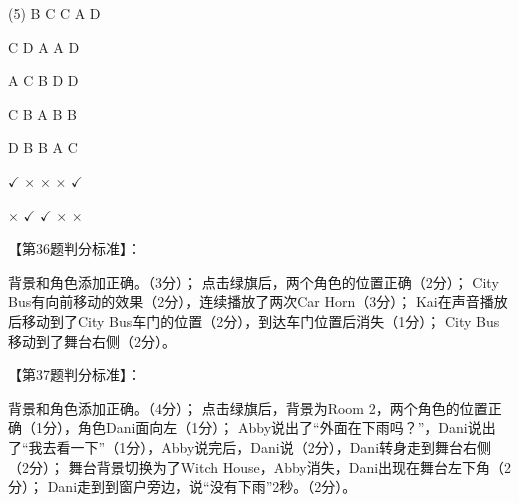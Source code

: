\documentclass[10pt, a4paper]{article}
\begin{document}
        \begin{tasks}[label=\arabic*.](5)
            \task B
            \task C
            \task C
            \task A
            \task D

            \task C
            \task D
            \task A
            \task A
            \task D

            \task A
            \task C
            \task B
            \task D
            \task D

            \task C
            \task B
            \task A
            \task B
            \task B

            \task D
            \task B
            \task B
            \task A
            \task C

            \task $\checkmark$
            \task $\times$
            \task $\times$
            \task $\times$
            \task $\checkmark$

            \task $\times$
            \task $\checkmark$
            \task $\checkmark$
            \task $\times$
            \task $\times$
        \end{tasks}

        【第36题判分标准】：
        \begin{tasks}[label=(\arabic*)]
            \task 背景和角色添加正确。（3分）；
            \task 点击绿旗后，两个角色的位置正确（2分）；
            \task City Bus有向前移动的效果（2分），连续播放了两次Car Horn（3分）；
            \task Kai在声音播放后移动到了City Bus车门的位置（2分），到达车门位置后消失（1分）；
            \task City Bus移动到了舞台右侧（2分）。
        \end{tasks}

        【第37题判分标准】：
        \begin{tasks}[label=(\arabic*)]
            \task 背景和角色添加正确。（4分）； 
            \task 点击绿旗后，背景为Room 2，两个角色的位置正确（1分），角色Dani面向左（1分）；
            \task Abby说出了“外面在下雨吗？”，Dani说出了“我去看一下”（1分），Abby说完后，Dani说（2分），Dani转身走到舞台右侧（2分）；
            \task 舞台背景切换为了Witch House，Abby消失，Dani出现在舞台左下角（2分）；
            \task Dani走到到窗户旁边，说“没有下雨”2秒。（2分）。
        \end{tasks}
\end{document}
